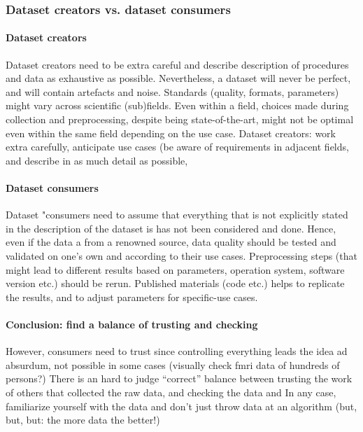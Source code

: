 \subsubsection{Dataset creators vs. dataset consumers}



\paragraph{Dataset creators}
%
Dataset creators need to be extra careful and describe description of procedures
and data as exhaustive as possible.
%
Nevertheless, a dataset will never be perfect, and will contain artefacts and
noise.
%
Standards (quality, formats, parameters) might vary across scientific
(sub)fields.
%
Even within a field, choices made during collection and preprocessing, despite
being state-of-the-art, might not be optimal even within the same field
depending on the use case.
%
Dataset creators: work extra carefully, anticipate use cases (be aware of
requirements in adjacent fields, and describe in as much detail as possible,


\paragraph{Dataset consumers}
%
Dataset "consumers need to assume that everything that is not explicitly stated
in the description of the dataset is has not been considered and done.
%
Hence, even if the data a from a renowned source, data quality should be tested
and validated on one's own and according to their use cases.
%
Preprocessing steps (that might lead to different results based on parameters,
operation system, software version etc.) should be rerun.
%
Published materials (code etc.) helps to replicate the results, and to adjust
parameters for specific-use cases.





\paragraph{Conclusion: find a balance of trusting and checking}

However, consumers need to trust since controlling everything leads the idea ad
absurdum, not possible in some cases (visually check fmri data of hundreds of
persons?)
%
There is an hard to judge ``correct'' balance between trusting the work of
others that collected the raw data, and checking the data and
%
In any case, familiarize yourself with the data and don't just throw data at an
algorithm (but, but, but: the more data the better!)


